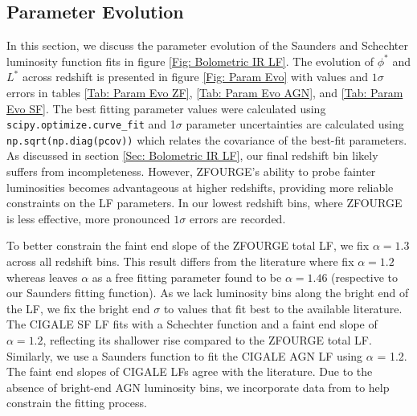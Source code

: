 \subsection{Parameter Evolution} \label{Sec: Parameter Evolution}
In this section, we discuss the parameter evolution of the Saunders and Schechter luminosity function fits in figure \ref{Fig: Bolometric IR LF}. The evolution of $\phi^{*}$ and $L^{*}$ across redshift is presented in figure \ref{Fig: Param Evo} with values and $1\sigma$ errors in tables \ref{Tab: Param Evo ZF}, \ref{Tab: Param Evo AGN}, and \ref{Tab: Param Evo SF}. The best fitting parameter values were calculated using \texttt{scipy.optimize.curve\_fit} \citep{virtanen_scipy_2020} and 1$\sigma$ parameter uncertainties are calculated using \texttt{np.sqrt(np.diag(pcov))} \citep{harris_array_2020} which relates the covariance of the best-fit parameters. As discussed in section \ref{Sec: Bolometric IR LF}, our final redshift bin likely suffers from incompleteness. However, ZFOURGE's ability to probe fainter luminosities becomes advantageous at higher redshifts, providing more reliable constraints on the LF parameters. In our lowest redshift bins, where ZFOURGE is less effective, more pronounced $1\sigma$ errors are recorded.

To better constrain the faint end slope of the ZFOURGE total LF, we fix $\alpha=1.3$ across all redshift bins. This result differs from the literature where \cite{rodighiero_mid-_2010, gruppioni_herschel_2013} fix $\alpha=1.2$ whereas \cite{fu_decomposing_2010} leaves $\alpha$ as a free fitting parameter found to be $\alpha=1.46$ (respective to our Saunders fitting function). As we lack luminosity bins along the bright end of the LF, we fix the bright end $\sigma$ to values that fit best to the available literature. The CIGALE SF LF fits with a Schechter function and a faint end slope of $\alpha=1.2$, reflecting its shallower rise compared to the ZFOURGE total LF. Similarly, we use a Saunders function to fit the CIGALE AGN LF using $\alpha$ = 1.2. The faint end slopes of CIGALE LFs agree with the literature. Due to the absence of bright-end AGN luminosity bins, we incorporate data from \cite{thorne_deep_2022} to help constrain the fitting process.

